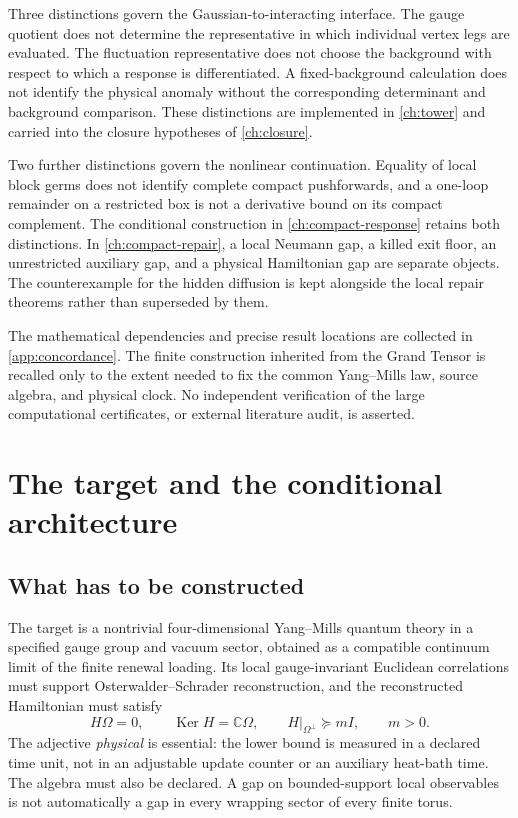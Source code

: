 \documentclass[11pt,oneside,openany]{book}
\theoremstyle{definition}
\theoremstyle{remark}
\newcommand{\C}{\mathbb C}
\newcommand{\Ker}{\operatorname{Ker}}
\begin{document}
Three distinctions govern the Gaussian-to-interacting interface. The
gauge quotient does not determine the representative in which individual
vertex legs are evaluated. The fluctuation representative does not choose
the background with respect to which a response is differentiated. A
fixed-background calculation does not identify the physical anomaly
without the corresponding determinant and background comparison. These
distinctions are implemented in \cref{ch:tower} and carried into the
closure hypotheses of \cref{ch:closure}.

Two further distinctions govern the nonlinear continuation. Equality of
local block germs does not identify complete compact pushforwards, and
a one-loop remainder on a restricted box is not a derivative bound on
its compact complement. The conditional construction in
\cref{ch:compact-response} retains both distinctions. In
\cref{ch:compact-repair}, a local Neumann gap, a killed exit floor, an
unrestricted auxiliary gap, and a physical Hamiltonian gap are separate
objects. The counterexample for the hidden diffusion is kept alongside
the local repair theorems rather than superseded by them.

The mathematical dependencies and precise result locations are collected
in \cref{app:concordance}. The finite construction inherited from the
Grand Tensor is recalled only to the extent needed to fix the common
Yang--Mills law, source algebra, and physical clock. No independent
verification of the large computational certificates, or external
literature audit, is asserted.

\tableofcontents
\mainmatter
\chapter{The target and the conditional architecture}
\label{ch:architecture}
\section{What has to be constructed}
The target is a nontrivial four-dimensional Yang--Mills quantum theory in a specified gauge group and vacuum sector, obtained as a compatible continuum limit of the finite renewal loading. Its local gauge-invariant Euclidean correlations must support Osterwalder--Schrader reconstruction, and the reconstructed Hamiltonian must satisfy
\begin{equation}\label{eq:target}
H\Omega=0,\qquad \Ker H=\C\Omega,\qquad
H|_{\Omega^\perp}\succeq mI,\qquad m>0.
\end{equation}
The adjective \emph{physical} is essential: the lower bound is measured in a declared time unit, not in an adjustable update counter or an auxiliary heat-bath time. The algebra must also be declared. A gap on bounded-support local observables is not automatically a gap in every wrapping sector of every finite torus.
\end{document}
